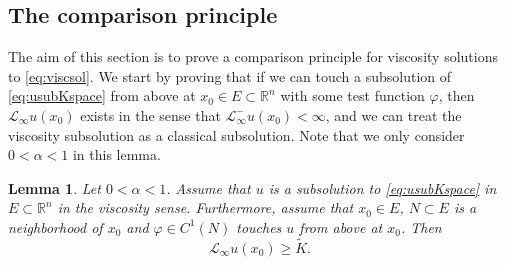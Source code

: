 \documentclass[11pt]{article}
\providecommand{\Linf}{\mathcal{L}_{\infty}}
\providecommand{\Lneg}{\mathcal{L}_{\infty}^-}
\providecommand{\Rn}{\mathbb{R}^n}
\newtheorem{lem}[thm]{Lemma}
\numberwithin{equation}{section}
\theoremstyle{definition}
\begin{document}
\subsection{The comparison principle}\label{sec:comparisonprinciple}
The aim of this section is to prove a comparison principle for viscosity solutions to \eqref{eq:viscsol}. We start by proving that if we can touch a subsolution of \eqref{eq:usubKspace} from above at $x_0 \in E \subset \Rn$ with some test function $\varphi$, then $\Linf u(x_0)$ exists in the sense that $\Lneg u(x_0) < \infty$, and we can treat the viscosity subsolution as a classical subsolution. Note that we only consider $0<\alpha<1$ in this lemma. 
\begin{lem}\label{lem:Linfpointwisespace}
      Let $0<\alpha <1$. Assume that $u$ is a subsolution to \eqref{eq:usubKspace} in $E\subset \Rn$
     in the viscosity sense. Furthermore, assume that $x_0 \in E$, $N \subset E$ is a neighborhood of $x_0$ and $\varphi \in C^1(N)$ touches $u$ from above at $x_0$. Then 
     \begin{equation*}
         \Linf u(x_0) \geq \tilde{K}.   
     \end{equation*}
\end{lem}
\end{document}
